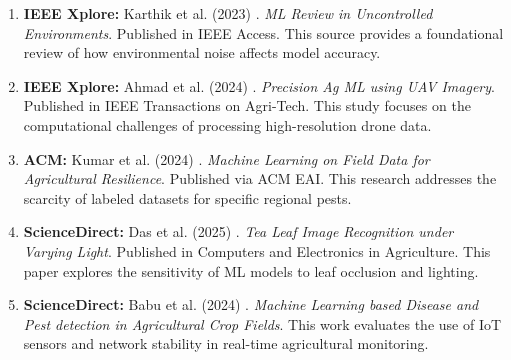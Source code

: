 \documentclass[12pt,a4paper]{article}
\begin{document}
\begin{enumerate}
    \item \textbf{IEEE Xplore:} Karthik et al. (2023) \cite{karthik2023}. \textit{ML Review in Uncontrolled Environments}. Published in IEEE Access. This source provides a foundational review of how environmental noise affects model accuracy.
    \item \textbf{IEEE Xplore:} Ahmad et al. (2024) \cite{uav_ml2024}. \textit{Precision Ag ML using UAV Imagery}. Published in IEEE Transactions on Agri-Tech. This study focuses on the computational challenges of processing high-resolution drone data.
    \item \textbf{ACM:} Kumar et al. (2024) \cite{eai2024}. \textit{Machine Learning on Field Data for Agricultural Resilience}. Published via ACM EAI. This research addresses the scarcity of labeled datasets for specific regional pests.
    \item \textbf{ScienceDirect:} Das et al. (2025) \cite{tea_precision2025}. \textit{Tea Leaf Image Recognition under Varying Light}. Published in Computers and Electronics in Agriculture. This paper explores the sensitivity of ML models to leaf occlusion and lighting.
    \item \textbf{ScienceDirect:} Babu et al. (2024) \cite{babu2024}. \textit{Machine Learning based Disease and Pest detection in Agricultural Crop Fields}. This work evaluates the use of IoT sensors and network stability in real-time agricultural monitoring.
\end{enumerate}
\newpage
\end{document}
